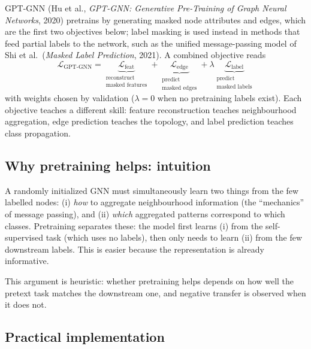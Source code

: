 \begin{notechapter}
GPT-GNN (Hu et al., \emph{GPT-GNN: Generative Pre-Training of Graph Neural Networks}, 2020) pretrains by generating masked node attributes and edges, which are the first two objectives below; label masking is used instead in methods that feed partial labels to the network, such as the unified message-passing model of Shi et al.\ (\emph{Masked Label Prediction}, 2021). A combined objective reads
\begin{equation}
\mathcal{L}_{\text{GPT-GNN}} =
  \underbrace{\mathcal{L}_{\text{feat}}}_{\substack{\text{reconstruct}\\\text{masked features}}}
  + \underbrace{\mathcal{L}_{\text{edge}}}_{\substack{\text{predict}\\\text{masked edges}}}
  + \lambda\underbrace{\mathcal{L}_{\text{label}}}_{\substack{\text{predict}\\\text{masked labels}}}
\end{equation}
with weights chosen by validation ($\lambda = 0$ when no pretraining labels exist). Each objective teaches a different skill: feature reconstruction teaches neighbourhood aggregation, edge prediction teaches the topology, and label prediction teaches class propagation.

\subsection{Why pretraining helps: intuition}

A randomly initialized GNN must simultaneously learn two things from the few
labelled nodes: (i) \emph{how} to aggregate neighbourhood information
(the ``mechanics'' of message passing), and (ii) \emph{which} aggregated
patterns correspond to which classes. Pretraining separates these: the model
first learns (i) from the self-supervised task (which uses no labels), then
only needs to learn (ii) from the few downstream labels. This is easier
because the representation is already informative.

This argument is heuristic: whether pretraining helps depends on how well the pretext task matches the downstream one, and negative transfer is observed when it does not.

\subsection{Practical implementation}


\end{notechapter}
